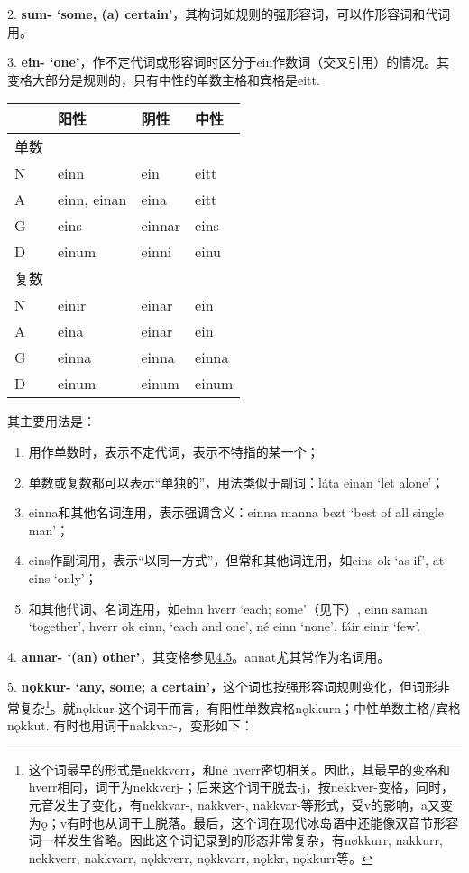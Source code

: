 2. \textbf{sum- `some, (a)
certain‌'}，其构词如规则的强形容词，可以作形容词和代词用。

3. \textbf{ein-
`one‌'}，作不定代词或形容词时区分于ein作数词（交叉引用）的情况。其变格大部分是规则的，只有中性的单数主格和宾格是eitt.

\begin{longtable}{llll}
\toprule
 & 阳性 & 阴性 & 中性 \\
\midrule
\endhead
\bottomrule
\endfoot
单数 & & & \\
N & einn & ein & eitt \\
A & einn, einan & eina & eitt \\
G & eins & einnar & eins \\
D & einum & einni & einu \\
复数 & & & \\
N & einir & einar & ein \\
A & eina & einar & ein \\
G & einna & einna & einna \\
D & einum & einum & einum \\
\end{longtable}

其主要用法是：

\begin{enumerate}
\def\labelenumi{\Alph{enumi}.}
\item
  用作单数时，表示不定代词，表示不特指的某一个；
\item
  单数或复数都可以表示``单独的''，用法类似于副词：láta einan `let
  alone'；
\item
  einna和其他名词连用，表示强调含义：einna manna bezt `best of all
  single man'；
\item
  eins作副词用，表示``以同一方式''，但常和其他词连用，如eins ok `as if',
  at eins `only'；
\item
  和其他代词、名词连用，如einn hverr `each; some‌'（见下）, einn saman
  `together', hverr ok einn, `each and one', né einn `none', fáir einir
  `few'.
\end{enumerate}

4. \textbf{annar- `(an)
other‌'}，其变格参见\hyperref[ux4e0dux89c4ux5219ux5f62ux5bb9ux8bcd]{4.5}。annat尤其常作为名词用。

5. \textbf{nǫkkur- `any, some; a
certain‌'，}这个词也按强形容词规则变化，但词形非常复杂\footnote{这个词最早的形式是nekkverr，和né
  hverr密切相关。因此，其最早的变格和hverr相同，词干为nekkverj-；后来这个词干脱去-j，按nekkver-变格，同时，元音发生了变化，有nekkvar-,
  nakkver-,
  nakkvar-等形式，受v的影响，a又变为ǫ；v有时也从词干上脱落。最后，这个词在现代冰岛语中还能像双音节形容词一样发生省略。因此这个词记录到的形态非常复杂，有nøkkurr,
  nakkurr, nekkverr, nakkvarr, nǫkkverr, nǫkkvarr, nǫkkr, nǫkkurr等。}。就nǫkkur-这个词干而言，有阳性单数宾格nǫkkurn；中性单数主格/宾格nǫkkut.
有时也用词干nakkvar-，变形如下：


